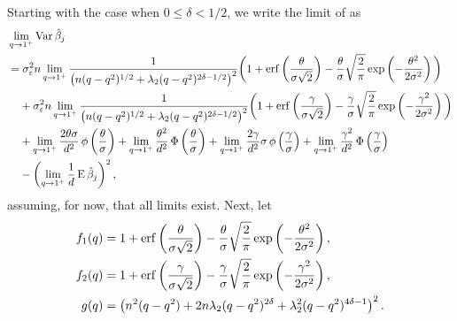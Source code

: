 Starting with the case when \(0 \leq \delta < 1/2\), we write the limit of
 as
\begin{align*}
   & \lim_{q \rightarrow 1^+} \var \hat{\beta}_j                                                                                                                                                                                                                                                                                                                                         \\ & = \sigma_\varepsilon^2 n  \lim_{q \rightarrow 1^+} \frac{1}{\left(n(q-q^2)^{1/2} + \lambda_2(q-q^2)^{2\delta - 1/2}\right)^2}\bigg(1 + \erf\left(\frac{\theta}{\sigma \sqrt{2}}\right) - \frac{\theta}{\sigma}\sqrt{\frac{2}{\pi}} \exp\left(-\frac{\theta^2}{2\sigma^2}\right)\bigg)                                                                                               \\
   & \phantom{= {}} + \sigma_\varepsilon^2 n  \lim_{q \rightarrow 1^+} \frac{1}{\left(n(q-q^2)^{1/2} + \lambda_2(q-q^2)^{2\delta - 1/2}\right)^2}\bigg(1 + \erf\left(\frac{\gamma}{\sigma\sqrt{2}}\right) - \frac{\gamma}{\sigma} \sqrt{\frac{2}{\pi}} \exp\left(- \frac{\gamma^2}{2\sigma^2}\right)\bigg)                                                                               \\
   & \phantom{= {}}+ \lim_{q \rightarrow 1^+} \frac{2\theta\sigma}{d^2} \pdf\left(\frac{\theta}{\sigma}\right) + \lim_{q \rightarrow 1^+} \frac{\theta^2}{d^2} \cdf\left(\frac{\theta}{\sigma}\right) + \lim_{q \rightarrow 1^+} \frac{2\gamma}{d^2} \sigma \pdf\left(\frac{\gamma}{\sigma}\right) + \lim_{q \rightarrow 1^+}\frac{\gamma^2}{d^2} \cdf\left(\frac{\gamma}{\sigma}\right) \\
   & \phantom{= {}}- \left( \lim_{q\rightarrow 1^+}\frac{1}{d}\E \hat{\beta}_j\right)^2,
\end{align*}
assuming, for now, that all limits exist. Next, let
\[
  \begin{aligned}
    f_1(q) & = 1 + \operatorname{erf}\left(\frac{\theta}{\sigma\sqrt{2}}\right) - \frac{\theta}{\sigma}\sqrt{\frac{2}{\pi}} \exp\left(-\frac{\theta^2}{2\sigma^2}\right) , \\
    f_2(q) & = 1 + \operatorname{erf}\left(\frac{\gamma}{\sigma\sqrt{2}}\right) - \frac{\gamma}{\sigma}\sqrt{\frac{2}{\pi}} \exp\left(-\frac{\gamma^2}{2\sigma^2}\right) , \\
    g(q)   & = \left(n^2(q-q^2) + 2n \lambda_2 (q-q^2)^{2\delta} + \lambda_2^2 (q-q^2)^{4\delta - 1}\right)^2.
  \end{aligned}
\]
